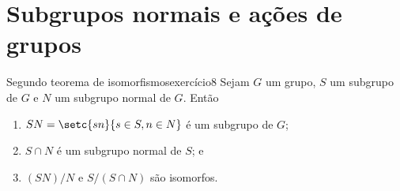 \section{Subgrupos normais e ações de grupos}
\begin{proposition}{Segundo teorema de isomorfismos}{exercício8}
    Sejam \(G\) um grupo, \(S\) um subgrupo de \(G\) e \(N\) um subgrupo normal de \(G\). Então
    \begin{enumerate}[label=(\alph*)]
        \item \(SN = \setc{sn}{s \in S, n \in N}\) é um subgrupo de \(G\);
        \item \(S \cap N\) é um subgrupo normal de \(S\); e
        \item \((SN)/N\) e \(S/(S \cap N)\) são isomorfos.
    \end{enumerate}
\end{proposition}
